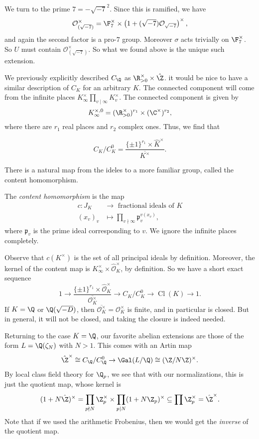 \documentclass[a4paper]{article}
\DeclareMathOperator\Cl{\mathrm{Cl}}
\begin{document}
\begin{eg}
  We turn to the prime $7 = -\sqrt{-7}^2$. Since this is ramified, we have
  \[
    \mathcal{O}_{(\sqrt{-7})}^\times = \F_7^\times \times \left(1 + (\sqrt{-7}) \mathcal{O}_{\sqrt{-7}}\right)^{\times},
  \]
  and again the second factor is a pro-$7$ group. Moreover $\sigma$ acts trivially on $\F_7^\times$. So $U$ must contain $\mathcal{O}_{(\sqrt{-7})}^\times$. So what we found above is the unique such extension.
\end{eg}

We previously explicitly described $C_\Q$ as $\R_{>0}^\times \times \hat{\Z}$. it would be nice to have a similar description of $C_K$ for an arbitrary $K$. The connected component will come from the infinite places $K_\infty^\times \prod_{v \mid \infty} K_v^\times$. The connected component is given by
\[
  K_\infty^{\times, 0} = (\R^\times_{> 0})^{r_1} \times (\C^\times)^{r_2},
\]
where there are $r_1$ real places and $r_2$ complex ones. Thus, we find that
\begin{prop}
  \[
    C_K/C_K^0 = \frac{\{\pm 1\}^{r_1} \times \hat{K}^\times}{\overline{K^\times}}.
  \]
\end{prop}

There is a natural map from the ideles to a more familiar group, called the content homomorphism.
\begin{defi}
  The \emph{content homomorphism} is the map
  \begin{align*}
    c: J_K&\to \text{ fractional ideals of }K\\
    (x_v)_v &\mapsto \prod_{v \nmid \infty}\mathfrak{p}_v^{v(x_v)},
  \end{align*}
  where $\mathfrak{p}_v$ is the prime ideal corresponding to $v$. We ignore the infinite places completely.
\end{defi}
Observe that $c(K^\times)$ is the set of all principal ideals by definition. Moreover, the kernel of the content map is $K_\infty^\times \times \hat{\mathcal{O}}_K^\times$, by definition. So we have a short exact sequence
\[
  1 \to \frac{\{\pm 1\}^{r_1} \times \hat{\mathcal{O}}_K^\times}{\overline{\mathcal{O}_K^\times}} \to C_K /C_K^0 \to \Cl(K) \to 1.
\]
If $K = \Q $ or $\Q(\sqrt{-D})$, then $\overline{\mathcal{O}_K^\times} = \mathcal{O}_K^\times$ is finite, and in particular is closed. But in general, it will not be closed, and taking the closure is indeed needed.

Returning to the case $K = \Q$, our favorite abelian extensions are those of the form $L = \Q(\zeta_N)$ with $N > 1$. This comes with an Artin map
\[
  \hat{\Z}^\times \cong C_\Q/C_\Q^0 \to \Gal(L/\Q) \cong (\Z/N\Z)^\times.
\]
By local class field theory for $\Q_p$, we see that with our normalizations, this is just the quotient map, whose kernel is
\[
  (1 + N \hat{\Z})^\times = \prod_{p \nmid N}\Z_p^\times \times \prod_{p \mid N} (1 + N \Z_p)^\times \subseteq \prod \Z_p^\times = \hat{\Z}^\times.
\]
Note that if we used the arithmetic Frobenius, then we would get the \emph{inverse} of the quotient map.
\end{document}
